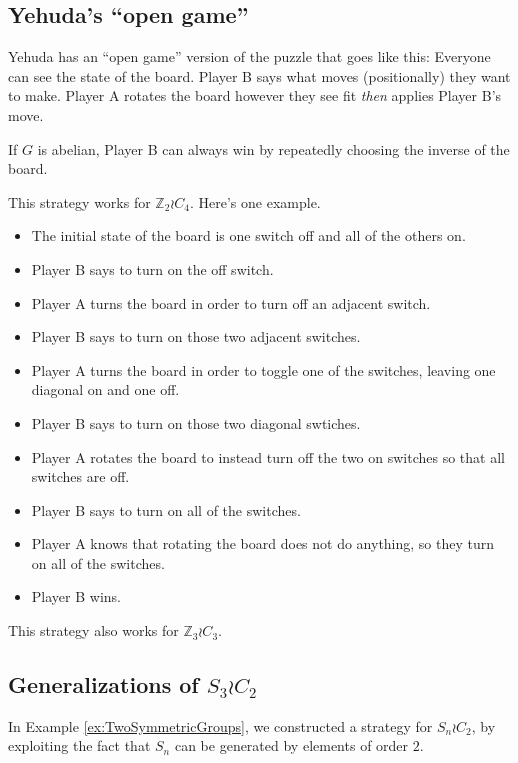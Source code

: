 \subsection{Yehuda's ``open game''}
Yehuda has an ``open game'' version of the puzzle that goes like this:
Everyone can see the state of the board.
Player B says what moves (positionally) they want to make.
Player A rotates the board however they see fit \textit{then} applies Player
B's move.
\begin{conjecture}
  If $G$ is abelian, Player B can always win by repeatedly choosing the inverse of the board.
\end{conjecture}

\begin{example} This strategy works for $\mathbb Z_2 \wr C_4$. Here's one example.
  \begin{itemize}
    \item The initial state of the board is one switch off and all of the others on.
    \item Player B says to turn on the off switch.
    \item Player A turns the board in order to turn off an adjacent switch.
    \item Player B says to turn on those two adjacent switches.
    \item Player A turns the board in order to toggle one of the switches, leaving one diagonal on and one off.
    \item Player B says to turn on those two diagonal swtiches.
    \item Player A rotates the board to instead turn off the two on switches so that all switches are off.
    \item Player B says to turn on all of the switches.
    \item Player A knows that rotating the board does not do anything, so they turn on all of the switches.
    \item Player B wins.
  \end{itemize}
\end{example}

This strategy also works for $\mathbb Z_3 \wr C_3$.

\subsection{Generalizations of \texorpdfstring{$S_3 \wr C_2$}{Two interchangeable copies of the symmetric group}}

In Example \ref{ex:TwoSymmetricGroups}, we constructed a strategy for $S_n \wr C_2$,
by exploiting the fact that $S_n$ can be generated by elements of order $2$.

